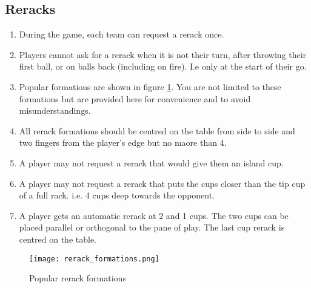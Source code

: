 	\subsection{Reracks}\label{ssec:Rerack}
		\begin{enumerate}[label=(\roman*)]
            \item \label{sssec:Rerack,number} During the game, each team can request a rerack once.
            \item \label{sssec:Rerack,notallowed} Players cannot ask for a rerack when it is not their turn, after throwing their first ball, or on balls back (including on fire).
                I.e only at the start of their go.
            \item \label{sssec:Rerack,pop_forms} Popular formations are shown in figure \ref{fig:rerack_forms}.
                You are not limited to these formations but are provided here for convenience and to avoid misunderstandings. 
            \item \label{sssec:Rerack,centering} All rerack formations should be centred on the table from side to side and two fingers from the player's edge but no maore than 4.
            \item \label{sssec:Rerack,Island} A player may not request a rerack that would give them an island cup.
            \item \label{sssec:Rerack,4cupdeep} A player may not request a rerack that puts the cups closer than the tip cup of a full rack.
                i.e. 4 cups deep towards the opponent.
            \item \label{sssec:Rerack,autoreracks} A player gets an automatic rerack at 2 and 1 cups.
                The two cups can be placed parallel or orthogonal to the pane of play.
                The last cup rerack is centred on the table.
        \end{enumerate}
        \begin{figure}
            \centering
            \texttt{[image: rerack\_formations.png]}
            \caption{Popular rerack formations}
            \label{fig:rerack_forms}
        \end{figure}
